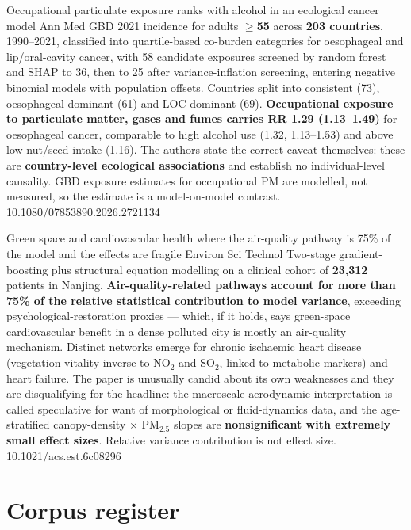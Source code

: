 \documentclass[10pt]{article}
\begin{document}
{Occupational particulate exposure ranks with alcohol in an ecological cancer model}
{Ann Med}
{GBD 2021 incidence for adults \textbf{$\geq$55} across \textbf{203 countries}, 1990--2021,
classified into quartile-based co-burden categories for oesophageal and lip/oral-cavity
cancer, with 58 candidate exposures screened by random forest and SHAP to 36, then to 25
after variance-inflation screening, entering negative binomial models with population
offsets. Countries split into consistent (73), oesophageal-dominant (61) and LOC-dominant
(69). \textbf{Occupational exposure to particulate matter, gases and fumes carries
RR 1.29 (1.13--1.49)} for oesophageal cancer, comparable to high alcohol use
(1.32, 1.13--1.53) and above low nut/seed intake (1.16). The authors state the correct
caveat themselves: these are \textbf{country-level ecological associations} and establish
no individual-level causality. GBD exposure estimates for occupational PM are modelled,
not measured, so the estimate is a model-on-model contrast.}
{10.1080/07853890.2026.2721134}

{Green space and cardiovascular health where the air-quality pathway is 75\% of the model
and the effects are fragile}
{Environ Sci Technol}
{Two-stage gradient-boosting plus structural equation modelling on a clinical cohort of
\textbf{23{,}312} patients in Nanjing. \textbf{Air-quality-related pathways account for
more than 75\% of the relative statistical contribution to model variance}, exceeding
psychological-restoration proxies --- which, if it holds, says green-space cardiovascular
benefit in a dense polluted city is mostly an air-quality mechanism. Distinct networks
emerge for chronic ischaemic heart disease (vegetation vitality inverse to NO$_2$ and
SO$_2$, linked to metabolic markers) and heart failure. The paper is unusually candid about
its own weaknesses and they are disqualifying for the headline: the macroscale aerodynamic
interpretation is called speculative for want of morphological or fluid-dynamics data, and
the age-stratified canopy-density $\times$ PM$_{2.5}$ slopes are \textbf{nonsignificant with
extremely small effect sizes}. Relative variance contribution is not effect size.}
{10.1021/acs.est.6c08296}

\vspace{4mm}

\section*{\sffamily\bfseries\color{Deep}Corpus register}
\vspace{-1.5mm}{\color{Amber}\rule{\linewidth}{1.1pt}}\vspace{2.5mm}
\end{document}
